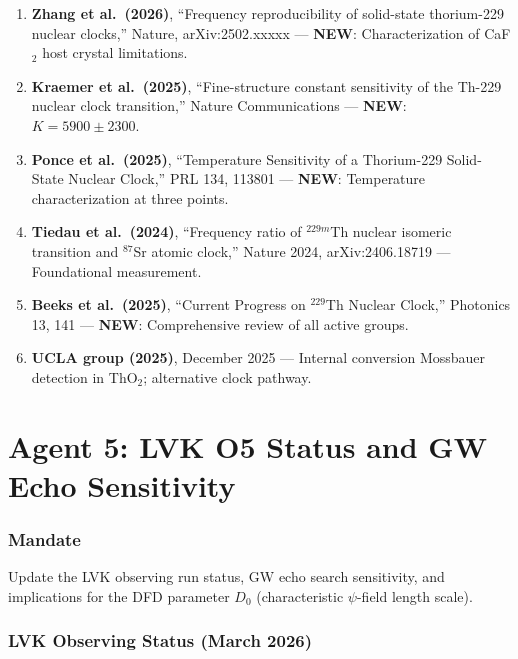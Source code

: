 \documentclass[11pt,a4paper]{article}
\newcommand{\NEW}{\textcolor{dfdblue}{\textbf{NEW}}}
\begin{document}
\begin{enumerate}
\item \textbf{Zhang et al.\ (2026)}, ``Frequency reproducibility of solid-state thorium-229 nuclear clocks,'' Nature, arXiv:2502.xxxxx --- \NEW: Characterization of CaF$_2$ host crystal limitations.

\item \textbf{Kraemer et al.\ (2025)}, ``Fine-structure constant sensitivity of the Th-229 nuclear clock transition,'' Nature Communications --- \NEW: $K = 5900 \pm 2300$.

\item \textbf{Ponce et al.\ (2025)}, ``Temperature Sensitivity of a Thorium-229 Solid-State Nuclear Clock,'' PRL 134, 113801 --- \NEW: Temperature characterization at three points.

\item \textbf{Tiedau et al.\ (2024)}, ``Frequency ratio of $^{229m}$Th nuclear isomeric transition and $^{87}$Sr atomic clock,'' Nature 2024, arXiv:2406.18719 --- Foundational measurement.

\item \textbf{Beeks et al.\ (2025)}, ``Current Progress on $^{229}$Th Nuclear Clock,'' Photonics 13, 141 --- \NEW: Comprehensive review of all active groups.

\item \textbf{UCLA group (2025)}, December 2025 --- Internal conversion Mossbauer detection in ThO$_2$; alternative clock pathway.
\end{enumerate}


\part{Agent 5: LVK O5 Status and GW Echo Sensitivity}
\label{part:agent5}

\section{Mandate}

Update the LVK observing run status, GW echo search sensitivity, and implications for the DFD parameter $D_0$ (characteristic $\psi$-field length scale).

\section{LVK Observing Status (March 2026)}
\end{document}
